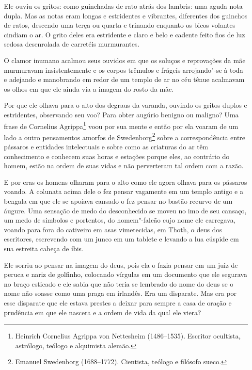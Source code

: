 Ele ouviu os gritos: como guinchadas de rato atrás dos lambris: uma
aguda nota dupla. Mas as notas eram longas e estridentes e vibrantes,
diferentes dos guinchos de ratos, descendo uma terça ou quarta e
trinando enquanto os bicos volantes cindiam o ar. O grito deles era
estridente e claro e belo e cadente feito fios de luz sedosa
desenrolada de carretéis murmurantes.

O clamor inumano acalmou seus ouvidos em que os soluços e reprovações da
mãe murmuravam insistentemente e os corpos trêmulos e frágeis
arrojando"-se à toda e adejando e manobrando em redor de um templo de ar
no céu tênue acalmavam os olhos em que ele ainda via a imagem do rosto
da mãe.

Por que ele olhava para o alto dos degraus da varanda, ouvindo os gritos duplos
e estridentes, observando seu voo? Para obter augúrio benigno ou maligno? Uma
frase de Cornelius Agrippa\footnote{ Heinrich Cornelius Agrippa von Nettesheim
(1486--1535). Escritor ocultista, astrólogo, teólogo e alquimista alemão.} voou
por sua mente e então por ela voaram de um lado a outro pensamentos amorfos de
Swedenborg\footnote{ Emanuel Swedenborg (1688--1772). Cientista, teólogo e
filósofo sueco.}  sobre a correspondência entre pássaros e entidades
intelectuais e sobre como as criaturas do ar têm conhecimento e conhecem suas
horas e estações porque eles, ao contrário do homem, estão na ordem de suas
vidas e não perverteram tal ordem com a razão.

E por eras os homens olharam para o alto como ele agora olhava para os
pássaros voando. A colunata acima dele o fez pensar vagamente em um
templo antigo e a bengala em que ele se apoiava cansado o fez pensar no
bastão recurvo de um áugure. Uma sensação de medo do desconhecido se
moveu no imo de seu cansaço, um medo de símbolos e portentos, do
homem"-falcão cujo nome ele carregava, voando para fora do cativeiro em
asas vimetecidas, em Thoth, o deus dos escritores, escrevendo com um 
junco em um tablete e levando a lua cúspide em sua estreita cabeça de
íbis.

Ele sorriu ao pensar na imagem do deus, pois ela o fazia pensar em um
juiz de peruca e nariz de golfinho, colocando vírgulas em um documento
que ele segurava no braço esticado e ele sabia que não teria se
lembrado do nome do deus se o nome não soasse como uma praga em
irlandês. Era um disparate. Mas era por esse disparate que ele estava prestes a deixar
para sempre a casa de oração e prudência em que ele nascera e a ordem
de vida da qual ele viera?

